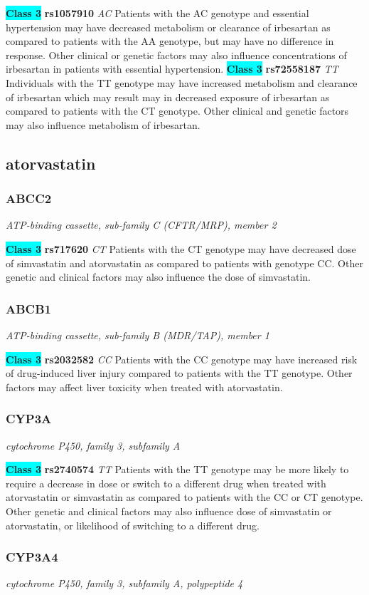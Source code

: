 \documentclass{report}
\begin{document}
\textbf{\colorbox{cyan} {Class 3}} \textbf{ rs1057910 } \textit{ AC }
Patients with the AC genotype and essential hypertension may have decreased metabolism or clearance of irbesartan as compared to patients with the AA genotype, but may have no difference in response. Other clinical or genetic factors may also influence concentrations of irbesartan in patients with essential hypertension. \newline\textbf{\colorbox{cyan} {Class 3}} \textbf{ rs72558187 } \textit{ TT }
Individuals with the TT genotype may have increased metabolism and clearance of irbesartan which may result may in decreased exposure of irbesartan as compared to patients with the CT genotype. Other clinical and genetic factors may also influence metabolism of irbesartan.\newline\subsection{ atorvastatin }\subsubsection{ ABCC2 }
\textit{ ATP-binding cassette, sub-family C (CFTR/MRP), member 2 }

\textbf{\colorbox{cyan} {Class 3}} \textbf{ rs717620 } \textit{ CT }
Patients with the CT genotype may have decreased dose of simvastatin and atorvastatin as compared to patients with genotype CC. Other genetic and clinical factors may also influence the dose of simvastatin.\newline\subsubsection{ ABCB1 }
\textit{ ATP-binding cassette, sub-family B (MDR/TAP), member 1 }

\textbf{\colorbox{cyan} {Class 3}} \textbf{ rs2032582 } \textit{ CC }
Patients with the CC genotype may have increased risk of drug-induced liver injury compared to patients with the TT genotype. Other factors may affect liver toxicity when treated with atorvastatin.\newline\subsubsection{ CYP3A }
\textit{ cytochrome P450, family 3, subfamily A }

\textbf{\colorbox{cyan} {Class 3}} \textbf{ rs2740574 } \textit{ TT }
Patients with the TT genotype may be more likely to require a decrease in dose or switch to a different drug when treated with atorvastatin or simvastatin as compared to patients with the CC or CT genotype. Other genetic and clinical factors may also influence dose of simvastatin or atorvastatin, or likelihood of switching to a different drug.\newline\subsubsection{ CYP3A4 }
\textit{ cytochrome P450, family 3, subfamily A, polypeptide 4 }
\end{document}
